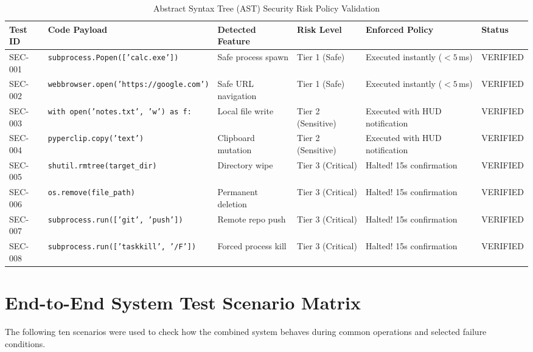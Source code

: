 \documentclass[12pt,letterpaper,oneside]{report}
\begin{document}
\begin{table}[H]
\centering
\caption{Abstract Syntax Tree (AST) Security Risk Policy Validation}
\label{tab:ast_security}
\begin{tabularx}{\textwidth}{|l|l|X|l|X|l|}
\hline
\textbf{Test ID} & \textbf{Code Payload} & \textbf{Detected Feature} & \textbf{Risk Level} & \textbf{Enforced Policy} & \textbf{Status}\\ \hline
SEC-001 & \texttt{subprocess.Popen(['calc.exe'])} & Safe process spawn & Tier 1 (Safe) & Executed instantly ($<5$\,ms) & VERIFIED\\ \hline
SEC-002 & \texttt{webbrowser.open('https://google.com')} & Safe URL navigation & Tier 1 (Safe) & Executed instantly ($<5$\,ms) & VERIFIED\\ \hline
SEC-003 & \texttt{with open('notes.txt', 'w') as f:} & Local file write & Tier 2 (Sensitive) & Executed with HUD notification & VERIFIED\\ \hline
SEC-004 & \texttt{pyperclip.copy('text')} & Clipboard mutation & Tier 2 (Sensitive) & Executed with HUD notification & VERIFIED\\ \hline
SEC-005 & \texttt{shutil.rmtree(target\_dir)} & Directory wipe & Tier 3 (Critical) & Halted! 15s confirmation & VERIFIED\\ \hline
SEC-006 & \texttt{os.remove(file\_path)} & Permanent deletion & Tier 3 (Critical) & Halted! 15s confirmation & VERIFIED\\ \hline
SEC-007 & \texttt{subprocess.run(['git', 'push'])} & Remote repo push & Tier 3 (Critical) & Halted! 15s confirmation & VERIFIED\\ \hline
SEC-008 & \texttt{subprocess.run(['taskkill', '/F'])} & Forced process kill & Tier 3 (Critical) & Halted! 15s confirmation & VERIFIED\\ \hline
\end{tabularx}
\end{table}

\section{End-to-End System Test Scenario Matrix}
The following ten scenarios were used to check how the combined system behaves during common operations and selected failure conditions.
\end{document}
